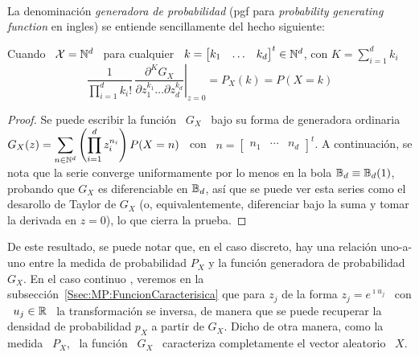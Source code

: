 \

La denominaci\'on  {\em generadora de  probabilidad} (pgf para  {\em probability
  generating function} en ingles) se entiende sencillamente del hecho siguiente:
%
\begin{lema}
\label{Lem:MP:GeneracionProbabilidades}
%
  Cuando \ $\mathcal{X} = \mathbb{N}^d$ \ para cualquier \ $k = \begin{bmatrix} k_1 & \ldots &
    k_d \end{bmatrix}^t \in \mathbb{N}^d$, con $K = \sum_{i=1}^d k_i$
  \[
  \frac1{\prod_{i=1}^d  k_i!} \, \left.\frac{\partial^K  G_X}{\partial z_1^{k_1}
      \ldots \partial z_d^{k_d}}\right|_{z=0} = P_X(k) = P(X = k)
  \]
\end{lema}
%
\begin{proof}
  Se puede escribir la funci\'on \ $G_X$ \ bajo su forma de generadora ordinaria
  \ $\displaystyle G_X(z) =  \sum_{n \in \mathbb{N}^d} \left( \prod_{i=1}^d z_i^{n_i}
  \right)  P(X   =  n)$  \   con  \  $n   =  \begin{bmatrix}  n_1  &   \cdots  &
    n_d  \end{bmatrix}^t$.  A  continuaci\'on,  se nota  que  la serie  converge
  uniformamente por  lo menos en  la bola $\mathbb{B}_d \equiv  \mathbb{B}_d(1)$, probando
  que $G_X$  es diferenciable en $\mathbb{B}_d$,  as\'i que se puede  ver esta series
  como el desarollo de Taylor de $G_X$ (o, equivalentemente, diferenciar bajo la
  suma y tomar la derivada en $z = 0$), lo que cierra la prueba.
\end{proof}

De este resultado,  se puede notar que, en el caso  discreto, hay una relaci\'on
uno-a-uno entre  la medida  de probabilidad $P_X$  y la funci\'on  generadora de
probabilidad $G_X$.  En el caso continuo  ,  veremos en la
subsecci\'on~\ref{Ssec:MP:FuncionCaracterisica} que para  $z_j$ de la forma $z_j
= e^{\imath u_j}$ \  con \ $u_j \in \mathbb{R}$ \ la  transformaci\'on se inversa, de
manera que se  puede recuperar la densidad de  probabilidad $p_X$  a partir de $G_X$. Dicho de otra manera, como la medida \
$P_X$, \ la funci\'on \ $G_X$  \ caracteriza completamente el vector aleatorio \
$X$.

\

